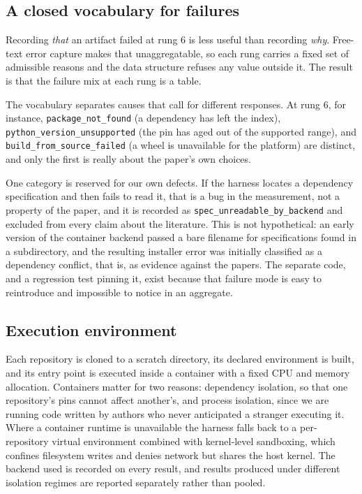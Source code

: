 \subsection{A closed vocabulary for failures}\label{sec:reasons}

Recording \emph{that} an artifact failed at rung 6 is less useful than recording
\emph{why}. Free-text error capture makes that unaggregatable, so each rung
carries a fixed set of admissible reasons and the data structure refuses any
value outside it. The result is that the failure mix at each rung is a table.

The vocabulary separates causes that call for different responses. At rung 6, for
instance, \texttt{package\_not\_found} (a dependency has left the index),
\texttt{python\_\allowbreak version\_\allowbreak unsupported} (the pin has aged
out of the supported range), and
\texttt{build\_\allowbreak from\_\allowbreak source\_\allowbreak failed} (a wheel is unavailable for the
platform) are distinct, and only the first is really about the paper's own
choices.

One category is reserved for our own defects. If the harness locates a
dependency specification and then fails to read it, that is a bug in the
measurement, not a property of the paper, and it is recorded as
\texttt{spec\_unreadable\_by\_backend} and excluded from every claim about the
literature. This is not hypothetical: an early version of the container backend
passed a bare filename for specifications found in a subdirectory, and the
resulting installer error was initially classified as a dependency conflict, that
is, as evidence against the papers. The separate code, and a regression test
pinning it, exist because that failure mode is easy to reintroduce and
impossible to notice in an aggregate.

\subsection{Execution environment}\label{sec:environment}

Each repository is cloned to a scratch directory, its declared environment is
built, and its entry point is executed inside a container with a fixed CPU and
memory allocation. Containers matter for two reasons: dependency isolation, so
that one repository's pins cannot affect another's, and process isolation, since
we are running code written by authors who never anticipated a stranger
executing it. Where a container runtime is unavailable the harness falls back to
a per-repository virtual environment combined with kernel-level sandboxing, which
confines filesystem writes and denies network but shares the host kernel. The
backend used is recorded on every result, and results produced under different
isolation regimes are reported separately rather than pooled.

